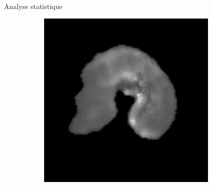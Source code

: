 \documentclass[10pt]{beamer}
\begin{document}
\begin{frame}{Analyse statistique}
\begin{figure}[ht]
\begin{subfigure}[t]{0.3\textwidth}
    \caption{}
    \label{subfig:reconstruction_t2_translated.png}
  \end{subfigure}%
    \begin{subfigure}[t]{0.3\textwidth}
    \centering
    \includegraphics[width=0.95\textwidth]{fig/msi_6_original.png}
    \caption{}
    \label{subfig:reconstruction_t2_translated.png}
  \end{subfigure}%
\end{figure}

\end{frame}
\end{document}
